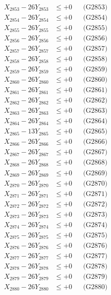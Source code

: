 \documentclass[a4paper,10pt]{article}
\begin{document}
{\begin{align}
X_{2853} - 26Y_{2853} &\leq +0 && \text{(G2853)} \\
X_{2854} - 26Y_{2854} &\leq +0 && \text{(G2854)} \\
X_{2855} - 26Y_{2855} &\leq +0 && \text{(G2855)} \\
X_{2856} - 26Y_{2856} &\leq +0 && \text{(G2856)} \\
X_{2857} - 26Y_{2857} &\leq +0 && \text{(G2857)} \\
X_{2858} - 26Y_{2858} &\leq +0 && \text{(G2858)} \\
X_{2859} - 26Y_{2859} &\leq +0 && \text{(G2859)} \\
X_{2860} - 26Y_{2860} &\leq +0 && \text{(G2860)} \\
\allowbreak
X_{2861} - 26Y_{2861} &\leq +0 && \text{(G2861)} \\
X_{2862} - 26Y_{2862} &\leq +0 && \text{(G2862)} \\
X_{2863} - 26Y_{2863} &\leq +0 && \text{(G2863)} \\
X_{2864} - 26Y_{2864} &\leq +0 && \text{(G2864)} \\
X_{2865} - 13Y_{2865} &\leq +0 && \text{(G2865)} \\
X_{2866} - 26Y_{2866} &\leq +0 && \text{(G2866)} \\
X_{2867} - 26Y_{2867} &\leq +0 && \text{(G2867)} \\
X_{2868} - 26Y_{2868} &\leq +0 && \text{(G2868)} \\
X_{2869} - 26Y_{2869} &\leq +0 && \text{(G2869)} \\
X_{2870} - 26Y_{2870} &\leq +0 && \text{(G2870)} \\
\allowbreak
X_{2871} - 26Y_{2871} &\leq +0 && \text{(G2871)} \\
X_{2872} - 26Y_{2872} &\leq +0 && \text{(G2872)} \\
X_{2873} - 26Y_{2873} &\leq +0 && \text{(G2873)} \\
X_{2874} - 26Y_{2874} &\leq +0 && \text{(G2874)} \\
X_{2875} - 26Y_{2875} &\leq +0 && \text{(G2875)} \\
X_{2876} - 26Y_{2876} &\leq +0 && \text{(G2876)} \\
X_{2877} - 26Y_{2877} &\leq +0 && \text{(G2877)} \\
X_{2878} - 26Y_{2878} &\leq +0 && \text{(G2878)} \\
X_{2879} - 26Y_{2879} &\leq +0 && \text{(G2879)} \\
X_{2880} - 26Y_{2880} &\leq +0 && \text{(G2880)} \\

\end{align}}
\end{document}
